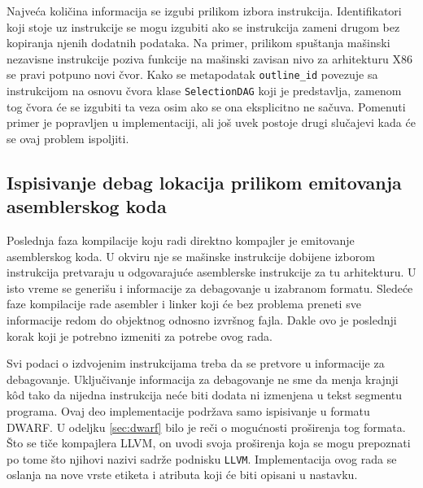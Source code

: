 \documentclass[12pt,oneside]{memoir}
\begin{document}
Najveća količina informacija se izgubi prilikom izbora instrukcija.
Identifikatori koji stoje uz instrukcije se mogu izgubiti ako se instrukcija zameni drugom bez kopiranja njenih dodatnih podataka.
Na primer, prilikom spuštanja mašinski nezavisne instrukcije poziva funkcije na mašinski zavisan nivo za arhitekturu X86 se pravi potpuno novi čvor.
Kako se metapodatak \verb|outline_id| povezuje sa instrukcijom na osnovu čvora klase \verb|SelectionDAG| koji je predstavlja, zamenom tog čvora će se izgubiti ta veza osim ako se ona eksplicitno ne sačuva.
Pomenuti primer je popravljen u implementaciji, ali još uvek postoje drugi slučajevi kada će se ovaj problem ispoljiti.

\subsection{Ispisivanje debag lokacija prilikom emitovanja asemblerskog koda}


Poslednja faza kompilacije koju radi direktno kompajler je emitovanje asemblerskog koda.
U okviru nje se mašinske instrukcije dobijene izborom instrukcija pretvaraju u odgovarajuće asemblerske instrukcije za tu arhitekturu.
U isto vreme se generišu i informacije za debagovanje u izabranom formatu.
Sledeće faze kompilacije rade asembler i linker koji će bez problema preneti sve informacije redom do objektnog odnosno izvršnog fajla.
Dakle ovo je poslednji korak koji je potrebno izmeniti za potrebe ovog rada.


Svi podaci o izdvojenim instrukcijama treba da se pretvore u informacije za debagovanje.
Uključivanje informacija za debagovanje ne sme da menja krajnji k\^od tako da nijedna instrukcija neće biti dodata ni izmenjena u tekst segmentu programa.
Ovaj deo implementacije podržava samo ispisivanje u formatu DWARF.
U odeljku \ref{sec:dwarf} bilo je reči o mogućnosti proširenja tog formata.
Što se tiče kompajlera LLVM, on uvodi svoja proširenja
koja se mogu prepoznati po tome što njihovi nazivi sadrže podnisku \verb|LLVM|.
Implementacija ovog rada se oslanja na nove vrste etiketa i atributa koji će biti opisani u nastavku.
\end{document}
